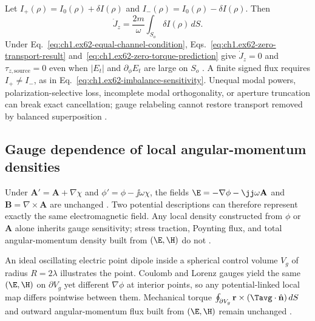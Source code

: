 Let
\(I_+(\rho)=I_0(\rho)+\delta I(\rho)\) and
\(I_-(\rho)=I_0(\rho)-\delta I(\rho)\). Then
\begin{equation}
\label{eq:ch1.ex62-imbalance-sensitivity}
\dot J_z
=
\frac{2m}{\omega}\int_{S_o}\delta I(\rho)\,dS.
\end{equation}
\label{prop:ch1.ex62-phase-insufficiency}
Under Eq.~\eqref{eq:ch1.ex62-equal-channel-condition}, Eqs.~\eqref{eq:ch1.ex62-zero-transport-result} and~\eqref{eq:ch1.ex62-zero-torque-prediction} give \(\dot J_z=0\) and \(\tau_{z,\mathrm{source}}=0\) even when \(|E_t|\) and \(\partial_\phi E_t\) are large on \(S_o\) \cite{stratton1941,beth1936}. A finite signed flux requires \(I_+\neq I_-\), as in Eq.~\eqref{eq:ch1.ex62-imbalance-sensitivity}. Unequal modal powers, polarization-selective loss, incomplete modal orthogonality, or aperture truncation can break exact cancellation; gauge relabeling cannot restore transport removed by balanced superposition \cite{poynting1884,harrington2001}.
\subsection{Gauge dependence of local angular-momentum densities}
\label{sec:ch01.6.3}

Under \(\mathbf{A}'=\mathbf{A}+\nabla\chi\) and \(\phi'=\phi-\jj\omega\chi\), the fields \(\E=-\nabla\phi-\jj\omega\mathbf{A}\) and \(\mathbf{B}=\nabla\times\mathbf{A}\) are unchanged \cite{maxwell1873}. Two potential descriptions can therefore represent exactly the same electromagnetic field. Any local density constructed from \(\phi\) or \(\mathbf{A}\) alone inherits gauge sensitivity; stress traction, Poynting flux, and total angular-momentum density built from \((\E,\H)\) do not \cite{belinfante1940,stratton1941}.

An ideal oscillating electric point dipole inside a spherical control volume $V_g$ of radius $R=2\lambda$ illustrates the point. Coulomb and Lorenz gauges yield the same $(\E,\H)$ on $\partial V_g$ yet different $\nabla\phi$ at interior points, so any potential-linked local map differs pointwise between them. Mechanical torque $\oint_{\partial V_g}\mathbf{r}\times(\Tavg\cdot\hat{\mathbf{n}})\,dS$ and outward angular-momentum flux built from $(\E,\H)$ remain unchanged \cite{belinfante1940,stratton1941}.

